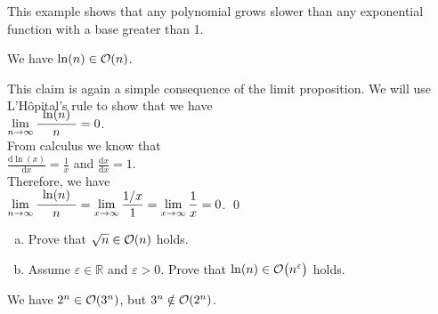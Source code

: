\remark
This example shows that any polynomial grows slower than any exponential function with a base greater than 1.
\eoxs

\example
We have $\ln(n) \in \mathcal{O}(n)$.
\ex

\proof
This claim is again a simple consequence of the limit proposition.  We will use L'H\^opital's rule
to show that we have
\\[0.4cm]
\hspace*{1.3cm} 
$\lim\limits_{n \rightarrow \infty} \bruch{\;\ln(n)\;}{n} = 0$.
\\[0.2cm]
From calculus we know that \\[0.2cm] 
\hspace*{1.3cm} $\displaystyle \frac{\mathrm{d} \ln(x)}{\mathrm{d}x} = \frac{1}{x}$ 
\quad and \quad
 $\displaystyle \frac{\mathrm{d} x}{\mathrm{d}x} = 1$. \\[0.2cm]
Therefore, we have \\[0.2cm]
\hspace*{1.3cm} 
$\displaystyle \lim\limits_{n \rightarrow \infty} \bruch{\;\ln(n)\;}{n} = 
\lim\limits_{x \rightarrow \infty} \frac{1/x}{1} = 
\lim\limits_{x \rightarrow \infty} \frac{1}{x} = 0$. \qed


\exercise
\begin{enumerate}[(a)]
\item Prove that $\sqrt{n} \in \mathcal{O}(n)$ holds.  
\item Assume $\varepsilon \in \mathbb{R}$ and $\varepsilon > 0$.
      Prove that $\ln(n) \in  \mathcal{O}\bigl(n^{\varepsilon}\bigr)$ holds. \eox
\end{enumerate}

\example
We have $2^n \in \mathcal{O}(3^n)$, but  $3^n \notin \mathcal{O}(2^n)$.
\ex

